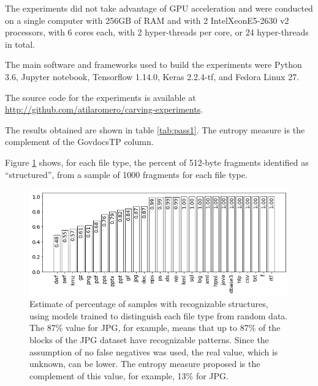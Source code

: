 The experiments did not take advantage of GPU acceleration and were  conducted on a single computer with 256GB of RAM and with 2 Intel\textregistered Xeon\textregistered E5-2630 v2 processors, with 6 cores each, with 2 hyper-threads per core, or 24 hyper-threads in total. 


The main software and frameworks used to build the experiments were Python 3.6, Jupyter notebook, Tensorflow 1.14.0, Keras 2.2.4-tf, and Fedora Linux 27.

The source code for the experiments is available at \sloppy\url{http://github.com/atilaromero/carving-experiments}.




The results obtained are shown in table \ref{tab:pass1}. The entropy measure is the complement of the GovdocsTP column.

Figure \ref{fig:not_random} shows, for each file type, the percent of 512-byte fragments identified as ``structured'', from a sample of 1000 fragments for each file type.

\noindent
\begin{figure}[htb!]
\centering\includegraphics[width=1.0\textwidth]{content/random.png}
\caption[Complement of entropy measure for 28 file types]{\label{fig:not_random}Estimate of percentage of samples with recognizable structures, using models trained to distinguish each file type from random data. The 87\% value for JPG, for example, means that up to 87\% of the blocks of the JPG dataset have recognizable patterns. Since the assumption of no false negatives was used, the real value, which is unknown, can be lower. The entropy measure proposed is the complement of this value, for example, 13\% for JPG.}%
\end{figure}
